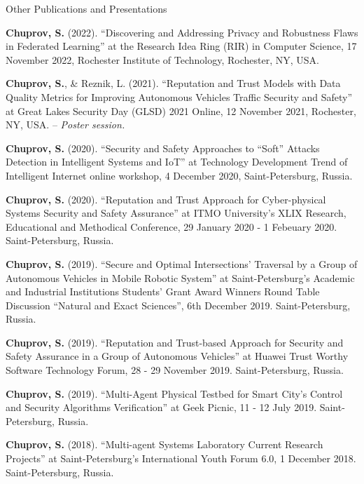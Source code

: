 \begin{rSection}{Other Publications and Presentations}
\begin{enumerate}[label={[NP\arabic*]}, itemsep=-0.5em]
\item \textbf{Chuprov, S.} (2022). ``Discovering and Addressing Privacy and Robustness Flaws in Federated Learning'' at the Research Idea Ring (RIR) in Computer Science, 17 November 2022, Rochester Institute of Technology, Rochester, NY, USA.

\item \textbf{Chuprov, S.}, \& Reznik, L. (2021). ``Reputation and Trust Models with Data Quality Metrics for Improving Autonomous Vehicles Traffic Security and Safety'' at Great Lakes Security Day (GLSD) 2021 Online, 12 November 2021, Rochester, NY, USA. -- \textit{Poster session.}

\item \textbf{Chuprov, S.} (2020). ``Security and Safety Approaches to “Soft” Attacks Detection in Intelligent Systems and IoT'' at Technology Development Trend of Intelligent Internet online workshop, 4 December 2020, Saint-Petersburg, Russia.  

\item \textbf{Chuprov, S.} (2020). ``Reputation and Trust Approach for Cyber-physical Systems Security and Safety Assurance'' at ITMO University's XLIX Research, Educational and Methodical Conference, 29 January 2020 - 1 Febeuary 2020. Saint-Petersburg, Russia. 

\item \textbf{Chuprov, S.} (2019). ``Secure and Optimal Intersections' Traversal by a Group of Autonomous Vehicles in Mobile Robotic System'' at Saint-Petersburg's Academic and Industrial Institutions Students' Grant Award Winners Round Table Discussion ``Natural and Exact Sciences'', 6th December 2019. Saint-Petersburg, Russia.    

\item \textbf{Chuprov, S.} (2019). ``Reputation and Trust-based Approach for Security and Safety Assurance in a Group of Autonomous Vehicles'' at Huawei Trust Worthy Software Technology Forum, 28 - 29 November 2019. Saint-Petersburg, Russia. 

\item \textbf{Chuprov, S.} (2019). ``Multi-Agent Physical Testbed for Smart City's Control and Security Algorithms Verification'' at Geek Picnic, 11 - 12 July 2019. Saint-Petersburg, Russia.

\item \textbf{Chuprov, S.} (2018). ``Multi-agent Systems Laboratory Current Research Projects'' at Saint-Petersburg's International Youth Forum 6.0, 1 December 2018. Saint-Petersburg, Russia. 
\end{enumerate}
\end{rSection}